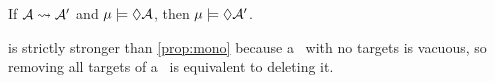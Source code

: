 % 
\begin{theorem}
        \label{theorem:strong-mono}
    If
    $\mathcal A \rightsquigarrow \mathcal A'$ 
    and $\mu \models \Diamond \mathcal A$, then  $\mu \models \Diamond \mathcal A'$.
\end{theorem}

 is strictly stronger than \cref{prop:mono}
because a \arc\ with no targets is vacuous, so
removing all targets of a \arc\ is equivalent to deleting it.

